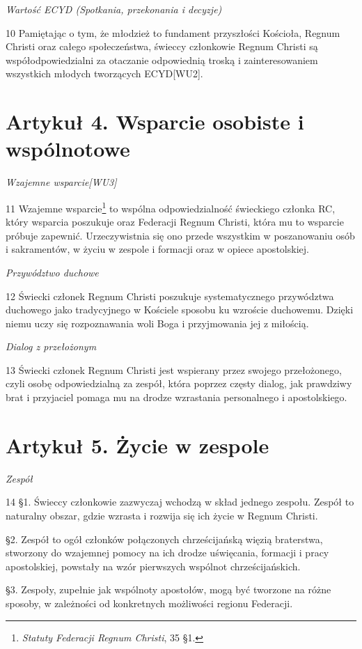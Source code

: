 ﻿\documentclass{report}
\newcommand{\lett}[1]{\lettrine[findent=6pt]{#1}{}}
\newcommand{\ssec}[1]{\vspace{1em}\textit{#1}\vspace{.5em}\nopagebreak}
\begin{document}
\ssec{Wartość ECYD (Spotkania, przekonania i decyzje)}


\lett{10} Pamiętając o tym, że młodzież to fundament przyszłości Kościoła, Regnum Christi oraz całego społeczeństwa, świeccy członkowie Regnum Christi są współodpowiedzialni za otaczanie odpowiednią troską i zainteresowaniem wszystkich młodych tworzących ECYD[WU2].


\section{Artykuł 4. Wsparcie osobiste i wspólnotowe}


\ssec{Wzajemne wsparcie[WU3]}


\lett{11} Wzajemne wsparcie\footnote{{\em Statuty Federacji Regnum Christi}, 35 \S{}1.} to wspólna odpowiedzialność świeckiego członka RC, który wsparcia poszukuje oraz Federacji Regnum Christi, która mu to wsparcie próbuje zapewnić. Urzeczywistnia się ono przede wszystkim w poszanowaniu osób i sakramentów, w życiu w zespole i formacji oraz w opiece apostolskiej.


\ssec{Przywództwo duchowe}


\lett{12} Świecki członek Regnum Christi poszukuje systematycznego przywództwa duchowego jako tradycyjnego w Kościele sposobu ku wzroście duchowemu. Dzięki niemu uczy się rozpoznawania woli Boga i przyjmowania jej z miłością.    


\ssec{Dialog z przełożonym}


\lett{13} Świecki członek Regnum Christi jest wspierany przez swojego przełożonego, czyli osobę odpowiedzialną za zespół, która poprzez częsty dialog, jak prawdziwy brat i przyjaciel pomaga mu na drodze wzrastania personalnego i apostolskiego.


\section{Artykuł 5. Życie w zespole}


\ssec{Zespół}


\lett{14} \S{}1. Świeccy członkowie zazwyczaj wchodzą w skład jednego zespołu. Zespół to naturalny obszar, gdzie wzrasta i rozwija się ich życie w Regnum Christi.


\S{}2. Zespół to ogół członków połączonych chrześcijańską więzią braterstwa, stworzony do wzajemnej pomocy na ich drodze uświęcania, formacji i pracy apostolskiej, powstały na wzór pierwszych wspólnot chrześcijańskich.


\S{}3. Zespoły, zupełnie jak wspólnoty apostołów, mogą być tworzone na różne sposoby, w zależności od konkretnych możliwości regionu Federacji.
 
\end{document}
